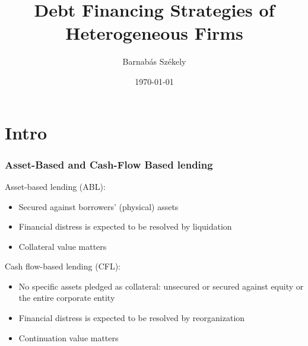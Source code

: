 \documentclass[notes]{beamer}
\title[]{Debt Financing Strategies of Heterogeneous Firms} %
\author{Barnab\'as Sz\'ekely} %
\date{\today } %
\begin{document}
\renewcommand{\arraystretch}{1.4}

\begin{frame}
\titlepage %
\end{frame}


\section{Intro}


\begin{frame}[label=slide2]
\frametitle{Asset-Based and Cash-Flow Based lending}

Asset-based lending (ABL):
\begin{itemize}
\item Secured against borrowers' (physical) assets
\item Financial distress is expected to be resolved by liquidation 
\item Collateral value matters
\end{itemize} \vspace{4mm}
Cash flow-based lending (CFL):
\begin{itemize}
\item No specific assets pledged as collateral: unsecured or secured against equity or the entire corporate entity 
\item Financial distress is expected to be resolved by reorganization 
\item Continuation value matters
\end{itemize}  \vspace{2mm}
\begin{center}
\hyperlink{secUnsec}{}
\end{center}
\end{frame}
\end{document}
